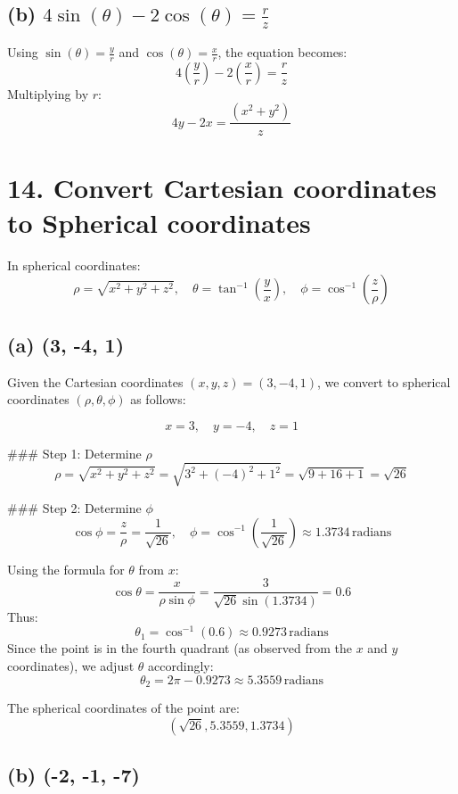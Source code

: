 \documentclass[11pt]{article}
\begin{document}
\subsection*{(b) \( 4 \sin(\theta) - 2 \cos(\theta) = \frac{r}{z} \)}
Using \(\sin(\theta) = \frac{y}{r}\) and \(\cos(\theta) = \frac{x}{r}\), the equation becomes:
\[
4\left(\frac{y}{r}\right) - 2\left(\frac{x}{r}\right) = \frac{r}{z}
\]
Multiplying by \(r\):
\[
4y - 2x = \frac{(x^2 + y^2)}{z}
\]

\section*{14. Convert Cartesian coordinates to Spherical coordinates}
In spherical coordinates:
\[
\rho = \sqrt{x^2 + y^2 + z^2}, \quad \theta = \tan^{-1}\left(\frac{y}{x}\right), \quad \phi = \cos^{-1}\left(\frac{z}{\rho}\right)
\]

\subsection*{(a) (3, -4, 1)}

Given the Cartesian coordinates \((x, y, z) = (3, -4, 1)\), we convert to spherical coordinates \((\rho, \theta, \phi)\) as follows:

\[
x = 3, \quad y = -4, \quad z = 1
\]

### Step 1: Determine \(\rho\)
\[
\rho = \sqrt{x^2 + y^2 + z^2} = \sqrt{3^2 + (-4)^2 + 1^2} = \sqrt{9 + 16 + 1} = \sqrt{26}
\]

### Step 2: Determine \(\phi\)
\[
\cos\phi = \frac{z}{\rho} = \frac{1}{\sqrt{26}}, \quad \phi = \cos^{-1}\left(\frac{1}{\sqrt{26}}\right) \approx 1.3734 \, \text{radians}
\]


Using the formula for \(\theta\) from \(x\):
\[
\cos\theta = \frac{x}{\rho \sin\phi} = \frac{3}{\sqrt{26} \sin(1.3734)} = 0.6
\]
Thus:
\[
\theta_1 = \cos^{-1}(0.6) \approx 0.9273 \, \text{radians}
\]
Since the point is in the fourth quadrant (as observed from the \(x\) and \(y\) coordinates), we adjust \(\theta\) accordingly:
\[
\theta_2 = 2\pi - 0.9273 \approx 5.3559 \, \text{radians}
\]


The spherical coordinates of the point are:
\[
\left( \sqrt{26}, 5.3559, 1.3734 \right)
\]


\subsection*{(b) (-2, -1, -7)}
\end{document}

